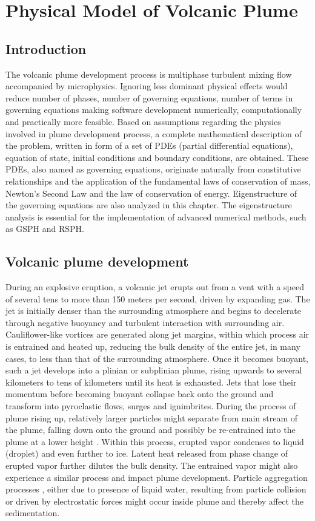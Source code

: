 \chapter{Physical Model of Volcanic Plume} \label{chapter:physics-model}
\section{Introduction}
The volcanic plume development process is multiphase turbulent mixing flow accompanied by microphysics. Ignoring less dominant physical effects would reduce number of phases, number of governing equations, number of terms in governing equations making software development numerically, computationally and practically more feasible. Based on assumptions regarding the physics involved in plume development process, a complete mathematical description of the problem, written in form of a set of PDEs (partial differential equations), equation of state, initial conditions and boundary conditions, are obtained. These PDEs, also named as governing equations, originate naturally from constitutive relationships and the application of the fundamental laws of conservation of mass, Newton's Second Law and the law of conservation of energy. Eigenstructure of the governing equations are also analyzed in this chapter. The eigenstructure analysis is essential for the implementation of advanced numerical methods, such as GSPH and RSPH.

\section{Volcanic plume development}
During an explosive eruption, a volcanic jet erupts out from a vent with a speed of several tens to more than 150 meters per second, driven by expanding gas. The jet is initially denser than the surrounding atmosphere and begins to decelerate through negative buoyancy and turbulent interaction with surrounding air. Cauliflower-like vortices are generated along jet margins, within which process air is entrained and heated up, reducing the bulk density of the entire jet, in many cases, to less than that of the surrounding atmosphere. Once it becomes buoyant, such a jet develops into a plinian or subplinian plume, rising upwards to several kilometers to tens of kilometers until its heat is exhausted. Jets that lose their momentum before becoming buoyant collapse back onto the ground and transform into pyroclastic flows, surges and ignimbrites. During the process of plume rising up, relatively larger particles might separate from main stream of the plume, falling down onto the ground and possibly be re-entrained into the plume at a lower height \citep{ernst1996sedimentation}. Within this process, erupted vapor condenses to liquid (droplet) and even further to ice. Latent heat released from phase change of erupted vapor further dilutes the bulk density. The entrained vapor might also experience a similar process and impact plume development. Particle aggregation processes \citep{carey1982influence,taddeucci2011aggregation}, either due to presence of liquid water, resulting from particle collision or driven by electrostatic forces might occur inside plume and thereby affect the sedimentation. 


